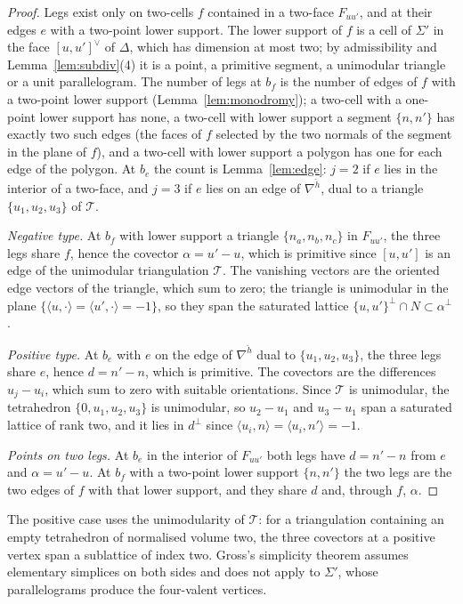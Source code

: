 \begin{proof}
Legs exist only on two-cells $f$ contained in a two-face $F_{uu'}$, and at their edges $e$ with a two-point lower support. The
lower support of $f$ is a cell of $\Sigma'$ in the face $[u,u']^\vee$ of $\Delta$, which has dimension at most two; by
admissibility and Lemma~\ref{lem:subdiv}(4) it is a point, a primitive segment, a unimodular triangle or a unit parallelogram.
The number of legs at $b_f$ is the number of edges of $f$ with a two-point lower support (Lemma~\ref{lem:monodromy}); a two-cell
with a one-point lower support has none, a two-cell with lower support a segment $\{n,n'\}$ has exactly two such edges (the faces
of $f$ selected by the two normals of the segment in the plane of $f$), and a two-cell with lower support a polygon has one for
each edge of the polygon. At $b_e$ the count is Lemma~\ref{lem:edge}: $j=2$ if $e$ lies in the interior of a two-face, and $j=3$ if
$e$ lies on an edge of $\nabla^{\check h}$, dual to a triangle $\{u_1,u_2,u_3\}$ of $\mathcal T$.

\emph{Negative type.} At $b_f$ with lower support a triangle $\{n_a,n_b,n_c\}$ in $F_{uu'}$, the three legs share $f$, hence the
covector $\alpha=u'-u$, which is primitive since $[u,u']$ is an edge of the unimodular triangulation $\mathcal T$. The vanishing
vectors are the oriented edge vectors of the triangle, which sum to zero; the triangle is unimodular in the plane
$\{\langle u,\cdot\rangle=\langle u',\cdot\rangle=-1\}$, so they span the saturated lattice $\{u,u'\}^\perp\cap N\subset\alpha^\perp$.

\emph{Positive type.} At $b_e$ with $e$ on the edge of $\nabla^{\check h}$ dual to $\{u_1,u_2,u_3\}$, the three legs share $e$,
hence $d=n'-n$, which is primitive. The covectors are the differences $u_j-u_i$, which sum to zero with suitable orientations.
Since $\mathcal T$ is unimodular, the tetrahedron $\{0,u_1,u_2,u_3\}$ is unimodular, so $u_2-u_1$ and $u_3-u_1$ span a saturated
lattice of rank two, and it lies in $d^\perp$ since $\langle u_i,n\rangle=\langle u_i,n'\rangle=-1$.

\emph{Points on two legs.} At $b_e$ in the interior of $F_{uu'}$ both legs have $d=n'-n$ from $e$ and $\alpha=u'-u$. At $b_f$ with
a two-point lower support $\{n,n'\}$ the two legs are the two edges of $f$ with that lower support, and they share $d$ and,
through $f$, $\alpha$.
\end{proof}

The positive case uses the unimodularity of $\mathcal T$: for a triangulation containing an empty tetrahedron of normalised
volume two, the three covectors at a positive vertex span a sublattice of index two. Gross's simplicity theorem
\cite[Thm.~3.16]{Gross2005} assumes elementary simplices on both sides and does not apply to $\Sigma'$, whose parallelograms
produce the four-valent vertices.

